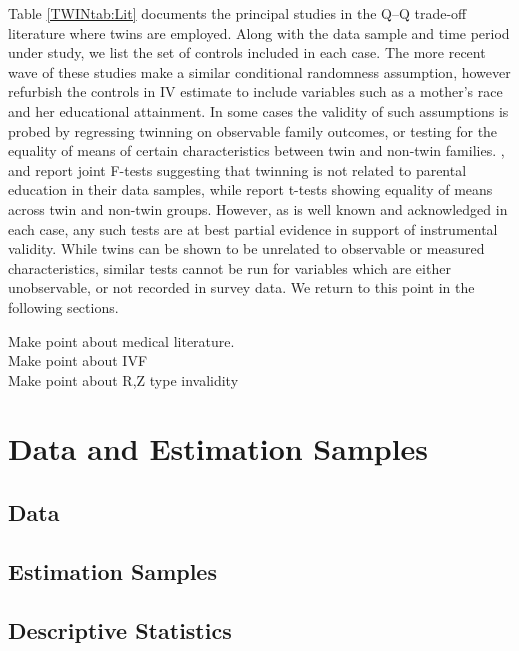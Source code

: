 \documentclass[subeqn]{article}
\begin{document}
\begin{spacing}{1.4}
Table \ref{TWINtab:Lit} documents the principal studies in the Q--Q trade-off 
literature where twins are employed.  Along with the data sample and time period 
under study, we list the set of controls included in each case.  The more recent
wave of these studies make a similar conditional randomness assumption, however
refurbish the controls in IV estimate to include variables such as a mother's 
race and her educational attainment.  In some cases the validity of such 
assumptions is probed by regressing twinning on observable family outcomes, or 
testing for the equality of means of certain characteristics between twin and
non-twin families. \citet{Blacketal2005}, \citet{Lietal2008} and 
\citet{Sanhueza2009} report joint F-tests suggesting that twinning is not related 
to parental education in their data samples, while \citet{RosenzweigZhang2009} 
report t-tests showing equality of means across twin and non-twin groups. 
However, as is well known and acknowledged in each case, any such tests are at 
best partial evidence in support of instrumental validity. While twins can be 
shown to be unrelated to observable or measured characteristics, similar tests 
cannot be run for variables which are either unobservable, or not recorded in 
survey data. We return to this point in the following sections.

Make point about medical literature.\\
Make point about IVF\\
Make point about R,Z type invalidity


\section{Data and Estimation Samples}              \label{TWINscn:data}
\subsection{Data}                                  \label{TWINsscn:data}
\subsection{Estimation Samples}                    \label{TWINsscn:samples}
\subsection{Descriptive Statistics}                \label{TWINsscn:descriptives}




\end{spacing}
\end{document}
